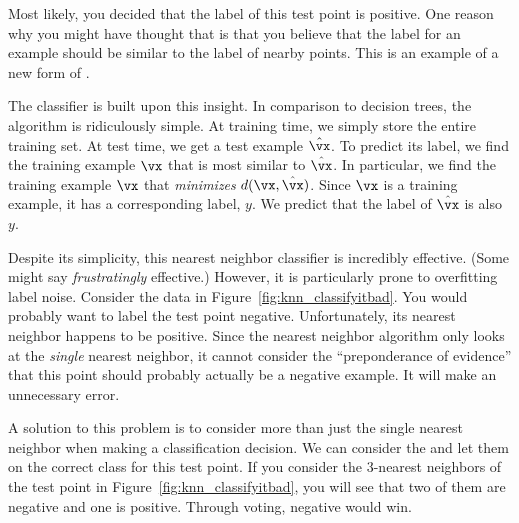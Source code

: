 Most likely, you decided that the label of this test point is
positive.  One reason why you might have thought that is that you
believe that the label for an example should be similar to the label
of nearby points.  This is an example of a new form of
.

The  classifier is built upon this insight.
In comparison to decision trees, the algorithm is ridiculously
simple.  At training time, we simply store the entire training set.
At test time, we get a test example $\hat\vx$.  To predict its label,
we find the training example $\vx$ that is most similar to $\hat\vx$.
In particular, we find the training example $\vx$ that
\emph{minimizes} $d(\vx,\hat\vx)$.  Since $\vx$ is a training example,
it has a corresponding label, $y$.  We predict that the label of
$\hat\vx$ is also $y$.


Despite its simplicity, this nearest neighbor classifier is incredibly
effective.  (Some might say \emph{frustratingly} effective.)  However,
it is particularly prone to overfitting label noise.  Consider the
data in Figure~\ref{fig:knn_classifyitbad}.  You would probably want
to label the test point negative.  Unfortunately, its nearest
neighbor happens to be positive.  Since the nearest neighbor algorithm
only looks at the \emph{single} nearest neighbor, it cannot consider
the ``preponderance of evidence'' that this point should probably
actually be a negative example.  It will make an unnecessary error.



A solution to this problem is to consider more than just the single
nearest neighbor when making a classification decision.  We can
consider the  and
let them  on the correct class for this test point.  If
you consider the $3$-nearest neighbors of the test point in
Figure~\ref{fig:knn_classifyitbad}, you will see that two of them are
negative and one is positive.  Through voting, negative would win.


